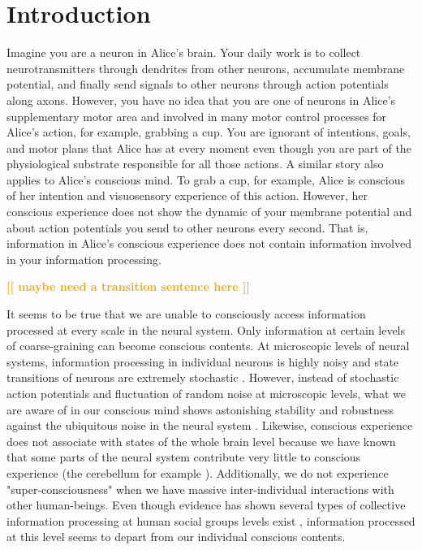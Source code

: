 \documentclass[utf8]{article}
\newcommand{\toWrite}[1]{\noindent
			\textcolor{Orange}{\textbf{[[ #1 ]]}}}
\begin{document}
    

    \newpage
	\section{Introduction}

		Imagine you are a neuron in Alice's brain. Your daily work is to collect neurotransmitters through dendrites from other neurons, accumulate membrane potential, and finally send signals to other neurons through action potentials along axons. However, you have no idea that you are one of neurons in Alice's supplementary motor area and involved in many motor control processes for Alice's action, for example, grabbing a cup. You are ignorant of intentions, goals, and motor plans that Alice has at every moment even though you are part of the physiological substrate responsible for all those actions.
		A similar story also applies to Alice's conscious mind. To grab a cup, for example, Alice is conscious of her intention and visuosensory experience of this action. However, her conscious experience does not show the dynamic of your membrane potential and about action potentials you send to other neurons every second. That is, information in Alice's conscious experience does not contain information involved in your information processing.

		\toWrite{maybe need a transition sentence here}

		It seems to be true that we are unable to consciously access information processed at every scale in the neural system. Only information at certain levels of coarse-graining can become conscious contents. At microscopic levels of neural systems, information processing in individual neurons is highly noisy and state transitions of neurons are extremely stochastic \citep{Goldwyn2011, White2000}. However, instead of stochastic action potentials and fluctuation of random noise at microscopic levels, what we are aware of in our conscious mind shows astonishing stability and robustness against the ubiquitous noise in the neural system \citep{mathis1995computational}. Likewise, conscious experience does not associate with states of the whole brain level because we have known that some parts of the neural system contribute very little to conscious experience (the cerebellum for example \citep{lemon2010life}). Additionally, we do not  experience "super-consciousness" when we have massive inter-individual interactions with other human-beings. Even though evidence has shown several types of collective information processing at human social groups levels exist \citep{malone2015handbook}, information processed at this level seems to depart from our individual conscious contents.
\end{document}
